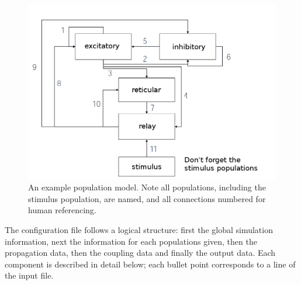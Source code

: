 \documentclass[12pt,a4paper]{article}
\begin{document}
\begin{figure}\begin{center}\includegraphics[scale=0.4]{pop.png}\caption{An example population model. Note all populations, including the stimulus population, are named, and all connections numbered for human referencing.}\label{fig:pop}\end{center}\end{figure}

The configuration file follows a logical structure: first the global simulation information, next the information for each populations given, then the propagation data, then the coupling data and finally the output data. Each component is described in detail below; each bullet point corresponds to a line of the input file.
\end{document}
